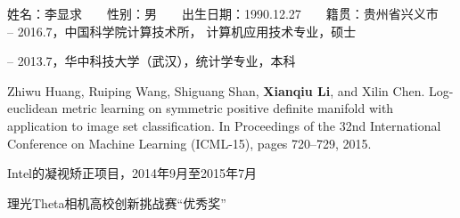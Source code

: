 \begin{resume}

\noindent
姓名：李显求　　性别：男　　出生日期：1990.12.27　　籍贯：贵州省兴义市\\

 -- 2016.7，中国科学院计算技术所， 计算机应用技术专业，硕士

 -- 2013.7，华中科技大学（武汉），统计学专业，本科\\


  \begin{enumerate}[{[}1{]}]
  \item Zhiwu Huang, Ruiping Wang, Shiguang Shan, \textbf{Xianqiu Li}, and Xilin Chen. Log-euclidean metric
learning on symmetric positive definite manifold with application to image set classification. In Proceedings of the 32nd International Conference on Machine Learning (ICML-15), pages 720–729,
2015.

  \end{enumerate}

  \begin{enumerate}[{[}1{]}]
  \item Intel的凝视矫正项目，2014年9月至2015年7月
  \end{enumerate}

  \begin{enumerate}[{[}1{]}]
  \item 理光Theta相机高校创新挑战赛“优秀奖”
  \end{enumerate}
\end{resume}
